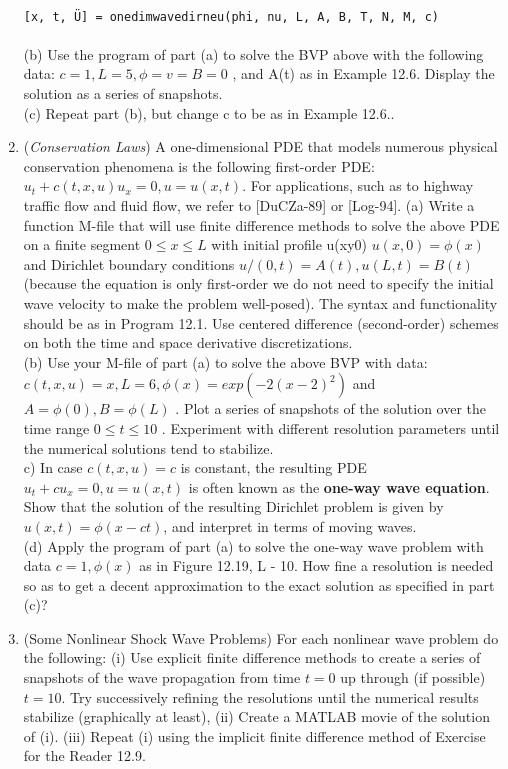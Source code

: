 \documentclass[../main.tex]{subfiles}
\begin{document}
\begin{enumerate}
\\ 
\texttt{[x, t, Ü] = onedimwavedirneu(phi, nu, L, A, B, T, N, M, c)}
\\
\\
(b) Use the program of part (a) to solve the BVP above with the following data: $c = 1, L = 5, \phi= v = B = 0$ , and A(t) as in Example 12.6. Display the solution as a series of snapshots. 
 \\
(c) Repeat part (b), but change c to be as in Example 12.6.. 
	\item
		(\textit{Conservation Laws}) A one-dimensional PDE that models numerous physical conservation phenomena is the following first-order PDE: $u_t + c(t,x,u)u_x = 0, u = u(x,t)$. For applications, such as to highway traffic flow and fluid flow, we refer to [DuCZa-89] or [Log-94]. (a) Write a function M-file that will use finite difference methods to solve the above PDE on a finite segment $0 \leqslant x \leqslant L$ with initial profile u(xy0) $u(x,0)= \phi(x)$ and Dirichlet boundary conditions $u/(0,t) = A(t),  u(L,t) = B(t)$ (because the equation is only first-order we do not need to specify the initial wave velocity to make the problem well-posed). The syntax and functionality should be as in Program 12.1. Use centered difference (second-order) schemes on both the time and space derivative discretizations. 
\\
(b) Use your M-file of part (a) to solve the above BVP with data: $c(t,x,u) =x, L = 6, \phi(x) = exp(-2(x- 2)^2)$ and $A = \phi(0), B = \phi(L)$ . Plot a series of snapshots of the solution over the time range $0 \leqslant t \leqslant 10$ . Experiment with different resolution parameters until the numerical solutions tend to stabilize. 
\\
c) In case $c(t,x,u) = c$ is constant, the resulting PDE $u_t +cu_x = 0, u = u(x,t)$ is often known 
as the \textbf{one-way wave equation}. Show that the solution of the resulting Dirichlet problem is 
given by $u(x,t) = \phi(x- ct)$, and interpret in terms of moving waves. 
\\
(d) Apply the program of part (a) to solve the one-way wave problem with data $c = 1, \phi(x)$ as in Figure 12.19, L - 10. How fine a resolution is needed so as to get a decent approximation to the exact solution as specified in part (c)? 
	\item
	(Some Nonlinear Shock Wave Problems) For each nonlinear wave problem do the following: (i) Use explicit finite difference methods to create a series of snapshots of the wave propagation from time $t = 0$ up through (if possible) $t = 10$. Try successively refining the resolutions until the numerical results stabilize (graphically at least), (ii) Create a MATLAB movie of the solution of (i). (iii) Repeat (i) using the implicit finite difference method of Exercise for the Reader 12.9. 

\end{enumerate}
\end{document}
